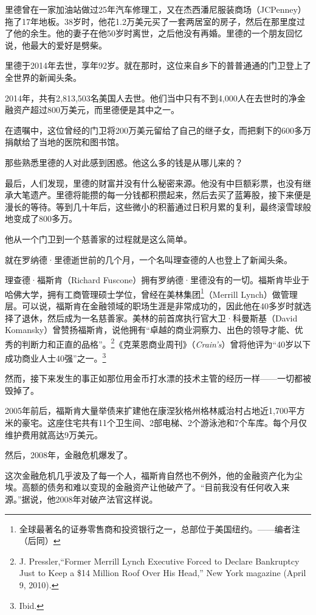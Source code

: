 里德曾在一家加油站做过25年汽车修理工，又在杰西潘尼服装商场（JCPenney）拖了17年地板。38岁时，他花1.2万美元买了一套两居室的房子，然后在那里度过了他的余生。他的妻子在他50岁时离世，之后他没有再婚。里德的一个朋友回忆说，他最大的爱好是劈柴。

里德于2014年去世，享年92岁。就在那时，这位来自乡下的普普通通的门卫登上了全世界的新闻头条。

2014年，共有2,813,503名美国人去世。他们当中只有不到4,000人在去世时的净金融资产超过800万美元，而里德便是其中之一。

在遗嘱中，这位曾经的门卫将200万美元留给了自己的继子女，而把剩下的600多万捐献给了当地的医院和图书馆。

那些熟悉里德的人对此感到困惑。他这么多的钱是从哪儿来的？

最后，人们发现，里德的财富并没有什么秘密来源。他没有中巨额彩票，也没有继承大笔遗产。里德将能攒的每一分钱都积攒起来，然后去买了蓝筹股，接下来便是漫长的等待。等到几十年后，这些微小的积蓄通过日积月累的复利，最终滚雪球般地变成了800多万。

他从一个门卫到一个慈善家的过程就是这么简单。

就在罗纳德·里德逝世前的几个月，一个名叫理查德的人也登上了新闻头条。

理查德·福斯肯（Richard Fuscone）拥有罗纳德·里德没有的一切。福斯肯毕业于哈佛大学，拥有工商管理硕士学位，曾经在美林集团\footnote{全球最著名的证券零售商和投资银行之一，总部位于美国纽约。——编者注（后同）}（Merrill Lynch）做管理层。可以说，福斯肯在金融领域的职场生涯是非常成功的，因此他在40多岁时就选择了退休，然后成为一名慈善家。美林的前首席执行官大卫·科曼斯基（David Komansky）曾赞扬福斯肯，说他拥有“卓越的商业洞察力、出色的领导才能、优秀的判断力和正直的品格”。\footnote{J. Pressler,“Former Merrill Lynch Executive Forced to Declare Bankruptcy Just to Keep a \$14 Million Roof Over His Head,” New York magazine (April 9, 2010).}《克莱恩商业周刊》（\textit{Crain’s}）曾将他评为“40岁以下成功商业人士40强”之一。\footnote{Ibid.}

然而，接下来发生的事正如那位用金币打水漂的技术主管的经历一样——一切都被毁掉了。

2005年前后，福斯肯大量举债来扩建他在康涅狄格州格林威治村占地近1,700平方米的豪宅。这座住宅共有11个卫生间、2部电梯、2个游泳池和7个车库。每个月仅维护费用就高达9万美元。

然后，2008年，金融危机爆发了。

这次金融危机几乎波及了每一个人，福斯肯自然也不例外，他的金融资产化为尘埃。高额的债务和难以变现的金融资产让他破产了。“目前我没有任何收入来源。”据说，他2008年对破产法官这样说。

